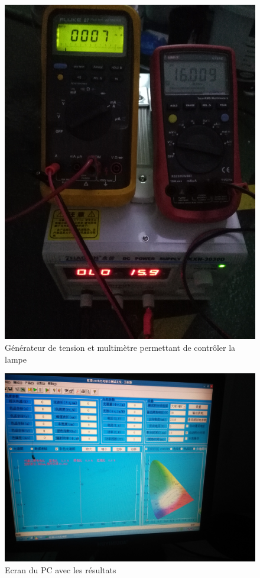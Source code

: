 \documentclass[a4paper, 12pt]{report}
\begin{document}
\begin{figure}[H]
\centering
\includegraphics[scale=0.08]{figures/photos/tests_worklamp/sphere/mesure_1.jpg}
\caption{Générateur de tension et multimètre permettant de contrôler la lampe}
\label{fig:multimeters}
\end{figure}

\begin{figure}[H]
\centering
\includegraphics[scale=0.08]{figures/photos/tests_worklamp/sphere/ecran_PC.jpg}
\caption{Ecran du PC avec les résultats} 
\label{fig:PC_screen}
\end{figure}

\listoffigures



\end{document}

